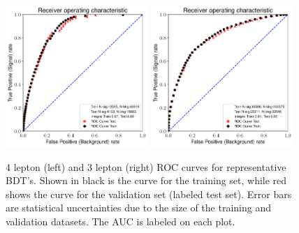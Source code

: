 \begin{figure}[htpb]
  \centering
  \includegraphics[width=0.48\textwidth]{figures/hmm/bdtHist/roc-4lep-ZH-AllBackground-0-depth2-nEst80tag-new-AllBackground.pdf}
  \includegraphics[width=0.48\textwidth]{figures/hmm/bdtHist/roc-3lep-WH-AllBackground-0-depth2-nEst50tag-new-AllBackground.pdf}
  \caption{4 lepton (left) and 3 lepton (right) ROC curves for representative BDT's. Shown in black is the curve for the training set, while red shows the curve for the validation set (labeled test set). Error bars are statistical uncertainties due to the size of the training and validation datasets. The AUC is labeled on each plot.}
    \label{fig:hmmBdtRoc}
\end{figure}




